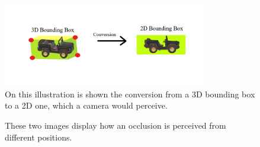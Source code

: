 \begin{figure} [h!]
    \centering
    \includegraphics[width=0.8\textwidth]{images/2D_bounding_boxes.png}
    \caption[3D bounding box conversion]{On this illustration is shown the conversion from a 3D bounding box to a 2D one, which a camera would perceive.}
    \label{fig:bb_conversion}
\end{figure}

\begin{figure} [h!]
  \centering
  \hfill
  \caption[Occlusion points of view]{These two images display how an occlusion is perceived from different positions.} \label{fig:occlusion_views}
\end{figure}

\newpage
